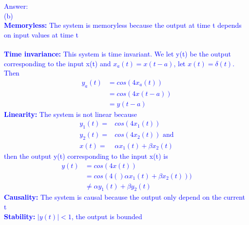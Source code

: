 \documentclass[12pt,a4paper]{article}
\begin{document}
\begin{tcolorbox}
    \normalsize
    \textcolor{blue}{Answer:\\
    (b) \\
    \textbf{Memoryless:} The system is memoryless because the output at time t depends on input values at time t\\ \\
    \textbf{Time invariance:} This system is time invariant. We let y(t) be the output corresponding to the input x(t) and $x_a(t)=x(t-a)$, let $x(t)=\delta(t)$. Then
    \begin{equation*}
        \begin{aligned}
            y_a(t)&=cos(4x_a(t))\\
            &=cos(4x(t-a))\\
            &=y(t-a)
        \end{aligned}
    \end{equation*}
    \textbf{Linearity:} The system is not linear because
    \begin{equation*}    
        \begin{aligned}
            y_1(t)=&cos(4x_1(t))\\
            y_2(t)=&cos(4x_2(t))\text{ and}\\
            x(t)=&\alpha x_1(t)+\beta x_2(t)
        \end{aligned}
    \end{equation*}
    then the output y(t) corresponding to the input x(t) is
    \begin{equation*}
        \begin{aligned}
            y(t)&=cos(4x(t))\\
            &=cos(4()\alpha x_1(t)+\beta x_2(t)))\\
            &\neq \alpha y_1(t)+\beta y_2(t)
        \end{aligned}
    \end{equation*}
    \textbf{Causality:} The system is causal because the output only depend on the current t\\
    \textbf{Stability:} $|y(t)|<1$, the output is bounded
    }
    \end{tcolorbox}
\end{document}
